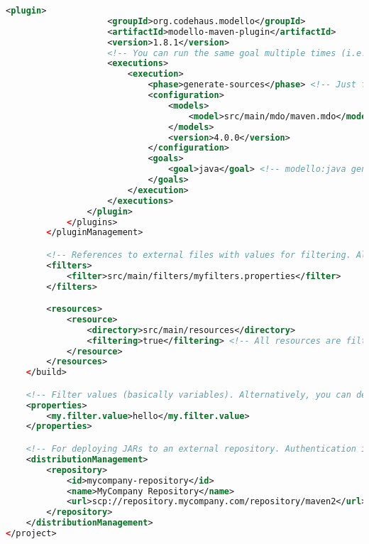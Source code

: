 \documentclass[8pt, table, xcdraw]{article}%
\begin{document}
\begin{lstlisting}[language=XML]
                <plugin>
                    <groupId>org.codehaus.modello</groupId>
                    <artifactId>modello-maven-plugin</artifactId>
                    <version>1.8.1</version>
                    <!-- You can run the same goal multiple times (i.e. multiple executions) with different configuration -->
                    <executions>
                        <execution>
                            <phase>generate-sources</phase> <!-- Just for demonstration, because modello:java only makes sense in this phase and that phase is the default -->
                            <configuration>
                                <models>
                                    <model>src/main/mdo/maven.mdo</model>
                                </models>
                                <version>4.0.0</version>
                            </configuration>
                            <goals>
                                <goal>java</goal> <!-- modello:java generates Java source code -->
                            </goals>
                        </execution>
                    </executions>
                </plugin>
            </plugins>
        </pluginManagement>

        <!-- References to external files with values for filtering. Alternatively, you can define values in <properties> -->
        <filters>
            <filter>src/main/filters/myfilters.properties</filter>
        </filters>

        <resources>
            <resource>
                <directory>src/main/resources</directory>
                <filtering>true</filtering> <!-- All resources are filtered, meaning variables (delimited by ${...} or @...@) are replaced with values. False by default, in which case the variables remain.  -->
            </resource>
        </resources>
    </build>

    <!-- Filter values (basically variables). Alternatively, you can define these properties externally and give the file(s) in <filters> -->
    <properties>
        <my.filter.value>hello</my.filter.value>
    </properties>

    <!-- For deploying JARs to an external repository. Authentication information goes in settings.xml -->
    <distributionManagement>
        <repository>
            <id>mycompany-repository</id>
            <name>MyCompany Repository</name>
            <url>scp://repository.mycompany.com/repository/maven2</url>
        </repository>
    </distributionManagement>
</project>
\end{lstlisting}
\end{document}
